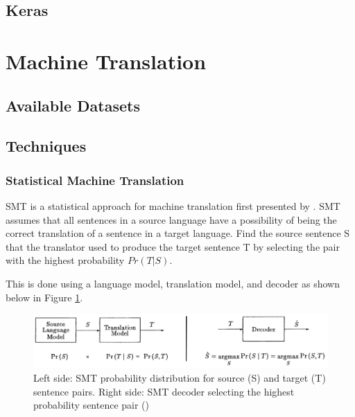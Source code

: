 \subsection{Keras}



\clearpage
\section{Machine Translation}
\label{Machine Translation}
\subsection{Available Datasets}

\subsection{Techniques}



\subsubsection{Statistical Machine Translation}

\acrfull{SMT} is a statistical approach for machine translation first presented by \cite{brown_statistical_1990}. 
\acrshort{SMT} assumes that all sentences in a source language have a possibility of being the correct translation of a sentence in a target language. 
Find the source sentence S that the translator used to produce the target sentence T by selecting the pair with the highest probability $Pr ( T | S )$.

This is done using a language model, translation model, and decoder
as shown below in Figure \ref{fig:smt_diagram}.

\begin{figure}[ht!]
\centering
\includegraphics[width=1\textwidth]{media/literature/machine_translation/smt_3.png}
\caption[Diagram of \acrshort{SMT} probability distribution and decoder]{Left side: \acrshort{SMT} probability distribution for source (S) and target (T) sentence pairs. Right side: \acrshort{SMT} decoder selecting the highest probability sentence pair (\cite{brown_statistical_1990})}
\label{fig:smt_diagram}
\end{figure}

